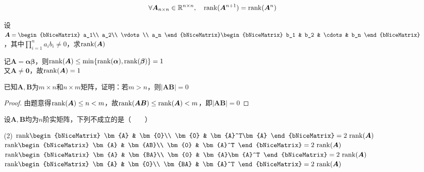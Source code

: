 \documentclass[12pt, a4paper, oneside, UTF8]{ctexbook}
\begin{document}
\begin{theorem}
    $$\forall \bm{A}_{n \times n} \in \mathbb{R}^{n \times n}, \quad \mathrm{rank}(\bm{A}^{n+1}) = \mathrm{rank}(\bm{A}^{n})$$
\end{theorem}
\begin{example}
    设$\bm{A}=\begin{bNiceMatrix}
        a_1\\
        a_2\\
        \vdots\\
        a_n
    \end{bNiceMatrix}
    \begin{bNiceMatrix}
        b_1 & b_2 & \cdots & b_n
    \end{bNiceMatrix}$，其中$\displaystyle\prod_{i=1}^{n}a_ib_i\neq 0$，求$\mathrm{rank}(\bm{A})$
\end{example}
\begin{solution}
    记$\bm{A}=\bm{\alpha}\bm{\beta}$，则$\mathrm{rank}(\bm{A}) \leq \min\{\mathrm{rank}(\bm{\alpha}), \mathrm{rank}(\bm{\beta})\} = 1$\\
    又$\bm{A} \neq \bm{0}$，故$\mathrm{rank}(\bm{A}) = 1$
\end{solution}
\begin{example}
    已知$\bm{A}, \bm{B}$为$m\times n$和$n\times m$矩阵，证明：若$m > n$，则$|\bm{AB}| = 0$
\end{example}
\begin{proof}
    由题意得$\mathrm{rank}(\bm{A}) \leq n < m$，故$\mathrm{rank}(\bm{AB}) \leq \mathrm{rank}(\bm{A}) < m$，即$|\bm{AB}| = 0$
\end{proof}
\begin{example}
    设$\bm{A}, \bm{B}$均为$n$阶实矩阵，下列不成立的是（　　）
    \begin{tasks}[style = itemize,label = \Alph*.](2)
        \task $\rank\begin{bNiceMatrix}
            \bm{A} & \bm{0}\\
            \bm{0} & \bm{A}^T\bm{A}
        \end{bNiceMatrix}=2~\rank(\bm{A})$
        \task $\rank\begin{bNiceMatrix}
            \bm{A} & \bm{AB}\\
            \bm{0} & \bm{A}^T
        \end{bNiceMatrix} = 2~\rank(\bm{A})$
        \task $\rank\begin{bNiceMatrix}
            \bm{A} & \bm{BA}\\
            \bm{0} & \bm{A}\bm{A}^T
        \end{bNiceMatrix}=2~\rank(\bm{A})$
        \task $\rank\begin{bNiceMatrix}
            \bm{A} & \bm{0}\\
            \bm{BA} & \bm{A}^T
        \end{bNiceMatrix}=2~\rank(\bm{A})$
    \end{tasks}
\end{example}
\end{document}
